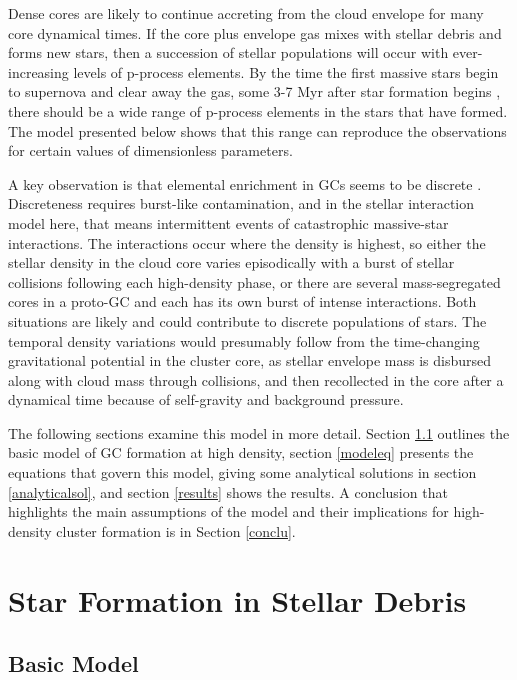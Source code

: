 \documentclass[12pt,preprint]{aastex}
\begin{document}
Dense cores are likely to continue accreting from the cloud envelope for many core
dynamical times. If the core plus envelope gas mixes with stellar debris and forms
new stars, then a succession of stellar populations will occur with ever-increasing
levels of p-process elements. By the time the first massive stars begin to
supernova and clear away the gas, some 3-7 Myr after star formation begins
\citep{heger03}, there should be a wide range of p-process elements in the stars
that have formed.  The model presented below shows that this range can reproduce
the observations for certain values of dimensionless parameters.

A key observation is that elemental enrichment in GCs seems to be discrete
\citep{marino11,carretta12,carretta14,renzini15}. Discreteness requires burst-like
contamination, and in the stellar interaction model here, that means intermittent
events of catastrophic massive-star interactions. The interactions occur where the
density is highest, so either the stellar density in the cloud core varies
episodically with a burst of stellar collisions following each high-density phase,
or there are several mass-segregated cores in a proto-GC \citep{mcmillan07,fujii13}
and each has its own burst of intense interactions. Both situations are likely and
could contribute to discrete populations of stars. The temporal density variations
would presumably follow from the time-changing gravitational potential in the
cluster core, as stellar envelope mass is disbursed along with cloud mass through
collisions, and then recollected in the core after a dynamical time because of
self-gravity and background pressure.


The following sections examine this model in more detail. Section \ref{basicmodel}
outlines the basic model of GC formation at high density, section \ref{modeleq}
presents the equations that govern this model, giving some analytical solutions in
section \ref{analyticalsol}, and section \ref{results} shows the results. A
conclusion that highlights the main assumptions of the model and their implications
for high-density cluster formation is in Section \ref{conclu}.


\section{Star Formation in Stellar Debris}
\subsection{Basic Model}
\label{basicmodel}
\end{document}

